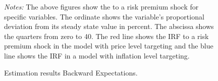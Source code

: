 \documentclass[11pt, a4paper, leqno]{article}
\begin{document}
\begin{figure}[ht!]
	\caption{Estimation results Backward Expectations.}
	\label{fig:irf}
	\centering
    	\bigskip
	\begin{minipage}{\textwidth}%
		\footnotesize\setlength{\baselineskip}{11pt}%
		\bigskip \textit{Notes:} The above figures show the  to a risk premium shock for specific variables. The ordinate shows the variable's proportional deviation from its steady state value in percent. The abscissa shows the quarters from zero to 40. The red line shows the IRF to a risk premium shock in the model with price level targeting and the blue line shows the IRF in a model with inflation level targeting.
	\end{minipage}
\end{figure}
\end{document}
